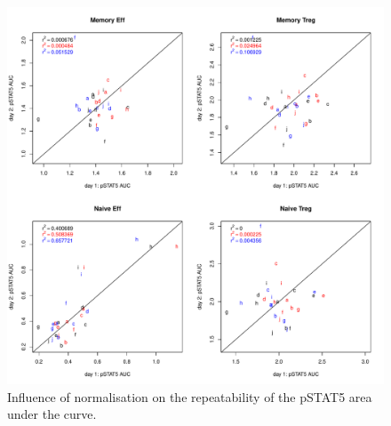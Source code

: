 \begin{figure}[h]
    \centering
    \includegraphics[scale=.5]{IL2/figures/pstat5-auc-repeatability-celltypes.pdf}
    { Influence of normalisation on the repeatability of the pSTAT5 area under the curve. }
    { }
\end{figure}








